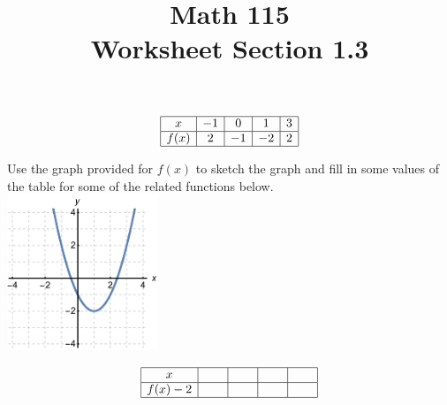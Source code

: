 \documentclass[11pt]{exam}
\title{\vspace{-1.25in} Math 115 \\ Worksheet Section 1.3}
\date{}
\begin{document}
\maketitle
\vspace{-1in}
\begin{questions}
  \question 
  \begin{multicols}{2}
	$$\begin{array}{|c|c|c|c|c|} \hline
            x  & -1 & 0 & 1 & 3 \\ \hline
            f(x)  & 2  & -1 & -2  & 2  \\
            \hline
          \end{array}$$	
	
          Use the graph provided for $f(x)$ to sketch the graph and
          fill in some values of the table for some of the related
          functions below. \\ \includegraphics[width=4.5cm]{Figures/parab}
\end{multicols}
\vspace{-0.3in}
\begin{multicols}{2}
 $$\begin{array}{|c|c|c|c|c|} \hline
x  & \hspace{.2in} & \hspace{.2in} & \hspace{.2in} & \hspace{.2in} \\ \hline
f(x)-2 &   &  &  &   \\
\hline
\end{array}$$  \\


\end{multicols}
\end{questions}
\end{document}
